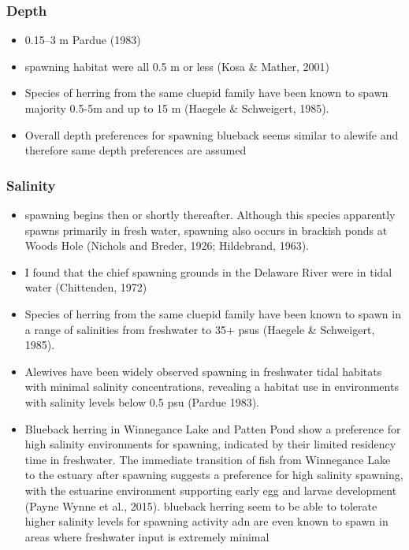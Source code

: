 \documentclass[
]{book}
\providecommand{\tightlist}{%
  \setlength{\itemsep}{0pt}\setlength{\parskip}{0pt}}
\begin{document}
\hypertarget{depth-3}{%
\subsubsection{Depth}\label{depth-3}}

\begin{itemize}
\tightlist
\item
  0.15--3 m Pardue (1983)
\item
  spawning habitat were all 0.5 m or less (Kosa \& Mather, 2001)
\item
  Species of herring from the same cluepid family have been known to spawn majority 0.5-5m and up to 15 m (Haegele \& Schweigert, 1985).
\item
  Overall depth preferences for spawning blueback seems similar to alewife and therefore same depth preferences are assumed
\end{itemize}

\hypertarget{salinity-3}{%
\subsubsection{Salinity}\label{salinity-3}}

\begin{itemize}
\item
  spawning begins then or shortly thereafter. Although this species apparently spawns primarily in fresh water, spawning also occurs in brackish ponds at Woods Hole (Nichols and Breder, 1926; Hildebrand, 1963).
\item
  I found that the chief spawning grounds in the Delaware River were in tidal water (Chittenden, 1972)
\item
  Species of herring from the same cluepid family have been known to spawn in a range of salinities from freshwater to 35+ psus (Haegele \& Schweigert, 1985).
\item
  Alewives have been widely observed spawning in freshwater tidal habitats with minimal salinity concentrations, revealing a habitat use in environments with salinity levels below 0.5 psu (Pardue 1983).
\item
  Blueback herring in Winnegance Lake and Patten Pond show a preference for high salinity environments for spawning, indicated by their limited residency time in freshwater. The immediate transition of fish from Winnegance Lake to the estuary after spawning suggests a preference for high salinity spawning, with the estuarine environment supporting early egg and larvae development (Payne Wynne et al., 2015). blueback herring seem to be able to tolerate higher salinity levels for spawning activity adn are even known to spawn in areas where freshwater input is extremely minimal
\end{itemize}
\end{document}
